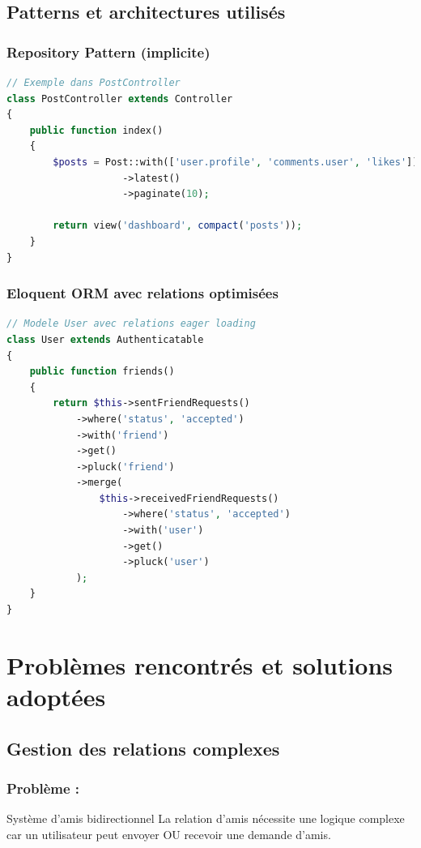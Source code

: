 \documentclass[12pt,a4paper]{article}
\begin{document}
\subsection{Patterns et architectures utilis\'es}

\subsubsection{Repository Pattern (implicite)}
\begin{lstlisting}[language=PHP]
// Exemple dans PostController
class PostController extends Controller
{
    public function index()
    {
        $posts = Post::with(['user.profile', 'comments.user', 'likes'])
                    ->latest()
                    ->paginate(10);
                    
        return view('dashboard', compact('posts'));
    }
}
\end{lstlisting}

\subsubsection{Eloquent ORM avec relations optimis\'ees}
\begin{lstlisting}[language=PHP]
// Modele User avec relations eager loading
class User extends Authenticatable
{
    public function friends()
    {
        return $this->sentFriendRequests()
            ->where('status', 'accepted')
            ->with('friend')
            ->get()
            ->pluck('friend')
            ->merge(
                $this->receivedFriendRequests()
                    ->where('status', 'accepted')
                    ->with('user')
                    ->get()
                    ->pluck('user')
            );
    }
}
\end{lstlisting}

\section{Probl\`emes rencontr\'es et solutions adopt\'ees}

\subsection{Gestion des relations complexes}

\subsubsection{Probl\`eme :} Syst\`eme d'amis bidirectionnel
La relation d'amis n\'ecessite une logique complexe car un utilisateur peut envoyer OU recevoir une demande d'amis.
\end{document}

